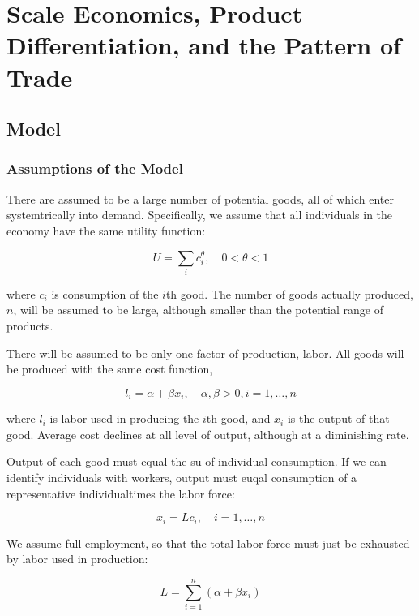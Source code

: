 \chapter{Scale Economics, Product Differentiation, and the Pattern of Trade}

\section{Model}

\subsection{Assumptions of the Model}

There are assumed to be a large number of potential goods, all of which enter systemtrically into demand. Specifically, we assume that all individuals in the economy have the same utility function:

\begin{equation}
    U = \sum_{i} c_i^{\theta}, \quad 0 < \theta < 1
\end{equation}

where $c_i$ is consumption of the $i$th good. The number of goods actually produced, $n$, will be assumed to be large, although smaller than the potential range of products.

There will be assumed to be only one factor of production, labor. All goods will be produced with the same cost function,

\begin{equation}
    l_i = \alpha + \beta x_i, \quad \alpha, \beta > 0, i = 1, \ldots, n
\end{equation}

where $l_i$ is labor used in producing the $i$th good, and $x_i$ is the output of that good. Average cost declines at all level of output, although at a diminishing rate.

Output of each good must equal the su of individual consumption. If we can identify individuals with workers, output must euqal consumption of a representative individualtimes the labor force:

\begin{equation}
    x_i = Lc_i, \quad i = 1, \ldots, n
\end{equation}

We assume full employment, so that the total labor force must just be exhausted by labor used in production:

\begin{equation}
    L = \sum_{i=1}^n (\alpha + \beta x_i)
\end{equation}

